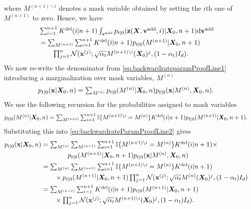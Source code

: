 where $M^{(n+1) \backslash i}$ denotes a mask variable obtained by setting the $i$th one of $M^{(n+1)}$ to zero.
Hence, we have 
\begin{align}
    &\textstyle \sum_{i=1}^{n+1} K^{\text{del}}(i | n+1) \int_{{\mathbf{v}}^{\textup{add}}} p_{t|0}(\mathbf{z}({\bm{X}}, {\mathbf{v}}^{\textup{add}}, i) | {\bm{X}}_0, n+1) \mathrm{d} {\mathbf{v}}^{\textup{add}} \\
    &\textstyle  = \sum_{M^{(n+1)}} \sum_{i=1}^{n+1} K^{\text{del}}(i | n+1)  p_{t|0}(M^{(n+1)} | {\bm{X}}_0, n+1) \\
  & \qquad \textstyle \prod_{j=1}^{n}\mathcal{N}( {\mathbf{x}}^{(j)} ; \sqrt{\alpha_t} M^{(n+1) \backslash i}({\bm{X}}_0)^j, (1-\alpha_t) I_d) .
    \label{eq:backwardrateParamProofLine1p5}
\end{align}
We now re-write the denominator from \eqref{eq:backwardrateparamProofLine1} introducing a marginalization over mask variables, $M^{(n)}$
\begin{equation}
    \textstyle p_{t|0}({\mathbf{x}} | {\bm{X}}_0, n) = \sum_{M^{(n)}} p_{t|0}(M^{(n)} | {\bm{X}}_0, n) p_{t|0}({\mathbf{x}} | M^{(n)}, {\bm{X}}_0, n)  . 
    \label{eq:backwardrateParamProofLine2}
\end{equation}
We use the following recursion for the probabilities assigned to mask variables
\begin{equation}
\textstyle    p_{t|0}(M^{(n)} | {\bm{X}}_0, n) = \sum_{M^{(n+1)}}  \sum_{i=1}^{n+1} \mathbb{I}\{ M^{(n+1) \backslash i} = M^{(n)} \} K^{\text{del}}(i | n+1) p_{t|0}(M^{(n+1)} | {\bm{X}}_0, n+1) . 
\end{equation}
 Substituting this into \eqref{eq:backwardrateParamProofLine2} gives
\begin{align}
    p_{t|0}({\mathbf{x}} | {\bm{X}}_0, n) &\textstyle = \sum_{M^{(n)}}  \sum_{M^{(n+1)}} \sum_{i=1}^{n+1} \mathbb{I}\{ M^{(n+1) \backslash i} = M^{(n)} \} K^{\text{del}}(i | n+1)  \times\\
    &\textstyle  \qquad \qquad p_{t|0}(M^{(n+1)} | {\bm{X}}_0, n+1) p_{t|0}({\mathbf{x}} | M^{(n)}, {\bm{X}}_0, n)\\
    &\textstyle = \sum_{M^{(n)}}  \sum_{M^{(n+1)}} \sum_{i=1}^{n+1} \mathbb{I}\{ M^{(n+1) \backslash i} = M^{(n)} \} K^{\text{del}}(i | n+1) \\ 
    &\textstyle  \qquad  \times  p_{t|0}(M^{(n+1)} | {\bm{X}}_0, n+1) \prod_{j=1}^n \mathcal{N}({\mathbf{x}}^{(j)} ; \sqrt{\alpha_t} M^{(n)} ({\bm{X}}_0)^j, (1-\alpha_t) I_d)\\
                          &\textstyle = \sum_{M^{(n+1)}} \sum_{i=1}^{n+1} K^{\text{del}}(i | n+1) p_{t|0}(M^{(n+1)} | {\bm{X}}_0, n+1)\\
  & \qquad \textstyle \times \prod_{j=1}^n \mathcal{N}({\mathbf{x}}^{(j)} ; \sqrt{\alpha_t} M^{(n+1) \backslash i} ({\bm{X}}_0)^j, (1-\alpha_t) I_d) .
\end{align}

